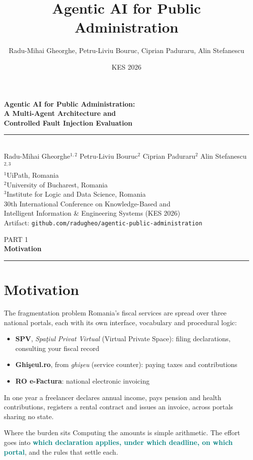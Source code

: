 \documentclass[aspectratio=169,10pt]{beamer}
\title[Agentic AI for Public Administration]{Agentic AI for Public Administration}
\author{Radu-Mihai Gheorghe, Petru-Liviu Bouruc, Ciprian Paduraru, Alin Stefanescu}
\date{KES 2026}
\newcommand{\hl}[1]{\textcolor{teal}{\textbf{#1}}}      %
\newcommand{\keypart}[2]{%
  \begin{frame}[plain, noframenumbering]
    \vfill
    \centering
    {\color{stone}\small #1}\\[0.35em]
    {\color{teal}\Large\bfseries #2}\\[0.9em]
    {\color{rust}\rule{0.25\paperwidth}{1.2pt}}
    \vfill\vfill
  \end{frame}%
}
\begin{document}
\begin{frame}
  \vfill
  \centering
  {\color{teal}\large\bfseries
   Agentic AI for Public Administration:\\[0.15em]
   A Multi-Agent Architecture and\\[0.15em]
   Controlled Fault Injection Evaluation}\\[0.8em]
  {\color{rust}\rule{0.42\paperwidth}{1pt}}\\[1.1em]

  Radu-Mihai Gheorghe$^{1,2}$ \quad Petru-Liviu Bouruc$^{2}$ \quad
  Ciprian Paduraru$^{2}$ \quad Alin Stefanescu$^{2,3}$\\[0.9em]

  {\footnotesize $^{1}$UiPath, Romania}\\[0.3em]
  {\footnotesize $^{2}$University of Bucharest, Romania}\\[0.3em]
  {\footnotesize $^{3}$Institute for Logic and Data Science, Romania}\\[1.2em]

  30th International Conference on Knowledge-Based and\\
  Intelligent Information \& Engineering Systems (KES 2026)\\[1.1em]

  {\color{stone}\footnotesize Artifact:
   \texttt{github.com/radugheo/agentic-public-administration}}
  \vfill
\end{frame}

\keypart{PART 1}{Motivation}
\section{Motivation}

\begin{frame}{The fragmentation problem}
  Romania's fiscal services are spread over three national portals, each with its own
  interface, vocabulary and procedural logic:
  \begin{itemize}
    \item \textbf{SPV}, \emph{Spa\c{t}iul Privat Virtual} (Virtual Private Space): filing
      declarations, consulting your fiscal record
    \item \textbf{Ghi\c{s}eul.ro}, from \emph{ghi\c{s}eu} (service counter): paying taxes and
      contributions
    \item \textbf{RO e-Factura}: national electronic invoicing
  \end{itemize}
  \vfill
  In one year a freelancer declares annual income, pays pension and health contributions,
  registers a rental contract and issues an invoice, across portals sharing no state.
  \vfill
  \begin{block}{Where the burden sits}
    Computing the amounts is simple arithmetic. The effort goes into \hl{which declaration
    applies, under which deadline, on which portal}, and the rules that settle each.
  \end{block}
\end{frame}
\end{document}
